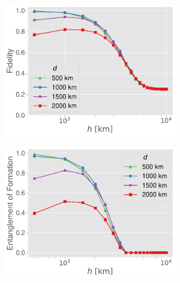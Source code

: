 \begin{figure}[h]
    \centering
    \begin{subfigure}[b]{0.4\textwidth}
        \centering
        \includegraphics[width=\textwidth]{figures/fidelity.pdf}
        \caption{}
        \label{fig:fid}
    \end{subfigure}
    \hspace{1cm}
    \begin{subfigure}[b]{0.4\textwidth}
        \centering
        \includegraphics[width=\textwidth]{figures/eof.pdf}
        \caption{}
        \label{fig:eof}
    \end{subfigure}
    \caption{}
    \label{fig:quant}
\end{figure}

